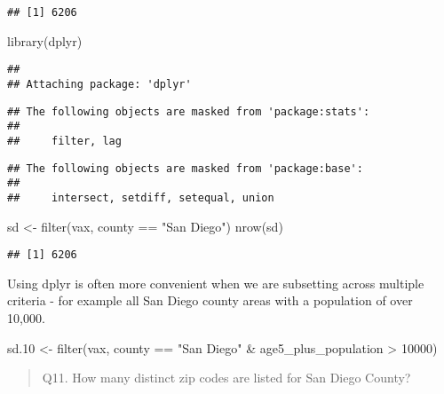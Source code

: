 \documentclass[
]{article}
\newenvironment{Shaded}{\begin{snugshade}}{\end{snugshade}}
\newcommand{\DecValTok}[1]{\textcolor[rgb]{0.00,0.00,0.81}{#1}}
\newcommand{\FloatTok}[1]{\textcolor[rgb]{0.00,0.00,0.81}{#1}}
\newcommand{\FunctionTok}[1]{\textcolor[rgb]{0.00,0.00,0.00}{#1}}
\newcommand{\NormalTok}[1]{#1}
\newcommand{\OtherTok}[1]{\textcolor[rgb]{0.56,0.35,0.01}{#1}}
\newcommand{\SpecialCharTok}[1]{\textcolor[rgb]{0.00,0.00,0.00}{#1}}
\newcommand{\StringTok}[1]{\textcolor[rgb]{0.31,0.60,0.02}{#1}}
\begin{document}
\begin{verbatim}
## [1] 6206
\end{verbatim}

\begin{Shaded}
\begin{Highlighting}[]
\FunctionTok{library}\NormalTok{(dplyr)}
\end{Highlighting}
\end{Shaded}

\begin{verbatim}
## 
## Attaching package: 'dplyr'
\end{verbatim}

\begin{verbatim}
## The following objects are masked from 'package:stats':
## 
##     filter, lag
\end{verbatim}

\begin{verbatim}
## The following objects are masked from 'package:base':
## 
##     intersect, setdiff, setequal, union
\end{verbatim}

\begin{Shaded}
\begin{Highlighting}[]
\NormalTok{sd }\OtherTok{\textless{}{-}} \FunctionTok{filter}\NormalTok{(vax, county }\SpecialCharTok{==} \StringTok{"San Diego"}\NormalTok{)}
\FunctionTok{nrow}\NormalTok{(sd)}
\end{Highlighting}
\end{Shaded}

\begin{verbatim}
## [1] 6206
\end{verbatim}

Using dplyr is often more convenient when we are subsetting across
multiple criteria - for example all San Diego county areas with a
population of over 10,000.

\begin{Shaded}
\begin{Highlighting}[]
\NormalTok{sd}\FloatTok{.10} \OtherTok{\textless{}{-}} \FunctionTok{filter}\NormalTok{(vax, county }\SpecialCharTok{==} \StringTok{"San Diego"} \SpecialCharTok{\&}
\NormalTok{                age5\_plus\_population }\SpecialCharTok{\textgreater{}} \DecValTok{10000}\NormalTok{)}
\end{Highlighting}
\end{Shaded}

\begin{quote}
Q11. How many distinct zip codes are listed for San Diego County?
\end{quote}
\end{document}
